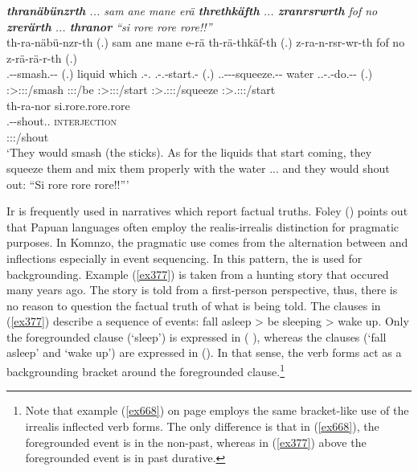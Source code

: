 \begin{exe}
	\ex \emph{\textbf{thranäbünzrth} ... sam ane mane erä \textbf{threthkäfth} ... \textbf{zranrsrwrth} fof no \textbf{zrerärth} ... \textbf{thranor} ``si rore rore rore!!''}\\
	\glll th-ra-näbü-nzr-th (.) sam ane mane e-rä th-rä-thkäf-th (.) z-ra-n-rsr-wr-th fof no z-rä-rä-r-th (.)\\
	\Stnsg.\Bet-\Irr-smash.\Ext-\Ndu-\Stnsg{} (.) liquid \Dem{} which \Stnsg.\Alph-\Cop.\Ndu{} \Stnsg.\Bet-\Irr.\Ndu-start.\Rs-\Stnsg{} (.) \Tsg.\F.\Bet-\Irr-\Venit-squeeze.\Ext-\Ndu-\Stnsg{} \Emph{} water \Tsg.\F.\Bet-\Irr.\Vc-do.\Ext-\Ndu-\Stnsg{} (.)\\
	\footnotesize{\Stpl:\Sbj>\Stpl:\Obj:\Irr:\Ipfv/smash} {} {} {} {} \footnotesize{\Stpl:\Sbj:\Nonpast:\Ipfv/be} \footnotesize{\Stpl:\Sbj>\Stpl:\Obj:\Irr:\Pfv/start} {}  \footnotesize{\Stpl:\Sbj>\Tsg.\F:\Obj:\Irr:\Ipfv/squeeze} {} {} \footnotesize{\Stpl:\Sbj>\Tsg.\F:\Io:\Irr:\Ipfv/start} {}\\
	\sn
	\glll th-ra-nor {si.rore.rore.rore}\\
	\Stnsg.\Bet-\Irr-shout.\Ext.\Ndu{} {\textsc{interjection}}\\
	\footnotesize{\Stpl:\Sbj:\Irr:\Ipfv/shout} {}\\
	\trans `They would smash (the sticks). As for the liquids that start coming, they squeeze them and mix them properly with the water ... and they would shout out: ``Si rore rore rore!!'''
	\label{ex426}
\end{exe}

Ir  is frequently used in narratives which report factual truths. Foley (\citeyear[389]{Foley:2000uh}) points out that Papuan languages often employ the realis-irrealis distinction for pragmatic purposes. In Komnzo, the pragmatic use comes from the alternation between  and  inflections especially in event sequencing. In this pattern, the  is used for backgrounding. Example (\ref{ex377}) is taken from a hunting story that occured many years ago. The story is told from a first-person perspective, thus, there is no reason to question the factual truth of what is being told. The clauses in (\ref{ex377}) describe a sequence of events: fall asleep > be sleeping > wake up. Only the foregrounded clause (`sleep') is expressed in  ( ), whereas the  clauses (`fall asleep' and `wake up') are expressed in  (). In that sense, the  verb forms act as a backgrounding bracket around the foregrounded clause.\footnote{Note that example (\ref{ex668}) on page \pageref{ex668} employs the same bracket-like use of the irrealis inflected verb forms. The only difference is that in (\ref{ex668}), the foregrounded event is in the non-past, whereas in (\ref{ex377}) above the foregrounded event is in past durative.}

